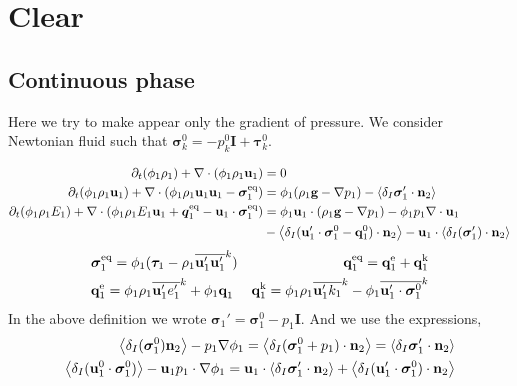 \Huge{ }\normalsize

\section{Clear}
\subsection{Continuous phase}
Here we try to make appear only the gradient of pressure. 
We consider Newtonian fluid such that $\bm{\sigma}_k^0 = -p^0_k \textbf{I} + \bm{\tau}_k^0$. 

\begin{align}
    \label{eq:dt_&vg_rho}
    \partial_t (\phi_1 \rho_1)  
    + \mathbf{\nabla}\cdot (
        \phi_1 \rho_1\textbf{u}_1
    )
    &= 
    0\\
    \label{eq:dt_&vg_rhou_1}
    \partial_t (\phi_1 \rho_1\textbf{u}_1)  
    + \mathbf{\nabla}\cdot (
        \phi_1 \rho_1\textbf{u}_1\textbf{u}_1
        - \bm{\sigma}_1^\text{eq}
    )
    &= 
    \phi_1  (\rho_1\textbf{g} - \mathbf{\nabla} p_1 )
    -  \left<\delta_I \bm{\sigma}_1' \cdot \textbf{n}_2\right>\\
    \label{eq:dt_&vg_rhoE_1}
    \partial_t (\phi_1\rho_1E_1)  
    + \mathbf{\nabla}\cdot (
        \phi_1\rho_1E_1\textbf{u}_1
        + \bm{q}_1^\text{eq}
        - \textbf{u}_1 \cdot \bm{\sigma}_1^\text{eq}
        )
    &= 
    \phi_1 \textbf{u}_1 \cdot (\rho_1\textbf{g}
    - \mathbf{\nabla} p_1 
    )
    - \phi_1 p_1 \mathbf{\nabla}\cdot \textbf{u}_1\\
    &- \left<\delta_I (\textbf{u}_1' \cdot \bm{\sigma}_1^0 
    - \textbf{q}_1^0)\cdot \textbf{n}_2\right>
    - \textbf{u}_1 \cdot \left<\delta_I ( \bm{\sigma}_1')\cdot \textbf{n}_2\right>
\end{align} 
\begin{align*}
    &\bm{\sigma}_1^\text{eq}
    = \phi_1 (
        \bm{\tau}_1%
        - \rho_1\kavg{\textbf{u}_1'\textbf{u}_1'})  
    &\textbf{q}_1^\text{eq}
    =\textbf{q}_1^\text{e} 
    +\textbf{q}_1^\text{k}  \\
    &\textbf{q}_1^\text{e}
    = \phi_1\rho_1 \kavg{\textbf{u}_1' e_1'} 
    + \phi_1\textbf{q}_1 
    &\textbf{q}_1^\text{k}
    = \phi_1\rho_1 \kavg{\textbf{u}_1' k_1} 
    - \phi_1\kavg{\textbf{u}_1' \cdot \bm{\sigma}_1^0}
\end{align*}
In the above definition we wrote $\bm{\sigma}_1' =\bm{\sigma}_1^0 - p_1 \textbf{I}$. And we use the expressions, 
\begin{align*}
    \left<\delta_I (\bm{\sigma}_1^0 ) \textbf{n}_2\right> - p_1 \mathbf{\nabla} \phi_1
    = 
    \left<\delta_I (\bm{\sigma}_1^0 + p_1)\cdot \textbf{n}_2\right>
    = 
    \left<\delta_I \bm{\sigma}_1'\cdot \textbf{n}_2\right>
    \\
    \left<\delta_I (\textbf{u}_1^0 \cdot\bm{\sigma}_1^0 )\right> - \textbf{u}_1p_1\cdot \mathbf{\nabla} \phi_1
    = \textbf{u}_1 \cdot \left<\delta_I \bm{\sigma}_1'\cdot \textbf{n}_2\right>
    + \left<\delta_I (\textbf{u}_1' \cdot \bm{\sigma}_1^0 )\cdot \textbf{n}_2\right>
\end{align*}
